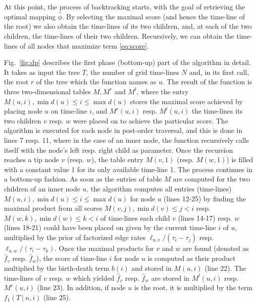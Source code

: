 \documentclass{llncs}
\begin{document}
At this point, the process of backtracking starts, with the goal of retrieving
the optimal mapping $\hat\phi$. By selecting the maximal score (and hence the
time-line of the root) we also obtain the time-lines of its two children, and,
at each of the two children, the time-lines of their two children. Recursively,
we can obtain the time-lines of all nodes that maximize term \ref{eq:score}.

Fig.~\ref{fig:dp} describes the first phase (bottom-up) part of the algorithm
in detail. It takes as input the tree $T$, the number of grid time-lines $N$
and, in its first call, the root $r$ of the tree which the function names as
$u$.  The result of the function is three two-dimensional tables $M, M^r$ and
$M^l$, where the entry $M(u,i), \min d(u) \leq i \leq \max d(u)$ stores the
maximal score achieved by placing node $u$ on time-line $i$, and $M^r(u,i)$
resp. $M^l(u,i)$ the time-lines its two children $v$ resp. $w$ were placed on
to achieve the particular score.  The algorithm is executed for each node in
post-order traversal, and this is done in lines 7 resp. 11, where in the case
of an inner node, the function recursively calls itself with the node's left
resp. right child as parameter. Once the recursion reaches a tip node $v$
(resp. $w$), the table entry $M(v,1)$ (resp. $M(w,1)$) is filled with a
constant value 1 for its only available time-line 1. The process continues in a
bottom-up fashion.  As soon as the entries of table $M$ are computed for the
two children of an inner node $u$, the algorithm computes all entries
(time-lines) $M(u,i), \min d(u) \leq i \leq \max d(u)$ for node $u$ (lines
12-25) by finding the maximal product from all scores $M(v,j), \min d(v) \leq j
< i$ resp.  $M(w,k), \min d(w) \leq k < i$ of time-lines each child $v$ (lines
14-17) resp. $w$ (lines 18-21) could have been placed on given by the current
time-line $i$ of $u$, multiplied by the prior of factorized edge rates
$\ell_{u,v}/(\tau_i - \tau_j)$ resp. $\ell_{u,w}/(\tau_i - \tau_k)$. Once the
maximal products for $v$ and $w$ are found (denoted as $\hat f_v$ resp. $\hat
f_w$), the score of time-line $i$ for node $u$ is computed as their product
multiplied by the birth-death term $b(i)$ and stored in $M(u,i)$ (line 22).
The time-lines of $v$ resp. $w$ which yielded $\hat f_{v}$ resp. $\hat f_{w}$
are stored in $M^l(u,i)$ resp. $M^r(u,i)$ (line 23). In addition, if node $u$
is the root, it is multiplied by the term $f_1(T\ |\ n,i)$ (line 25).
\end{document}
